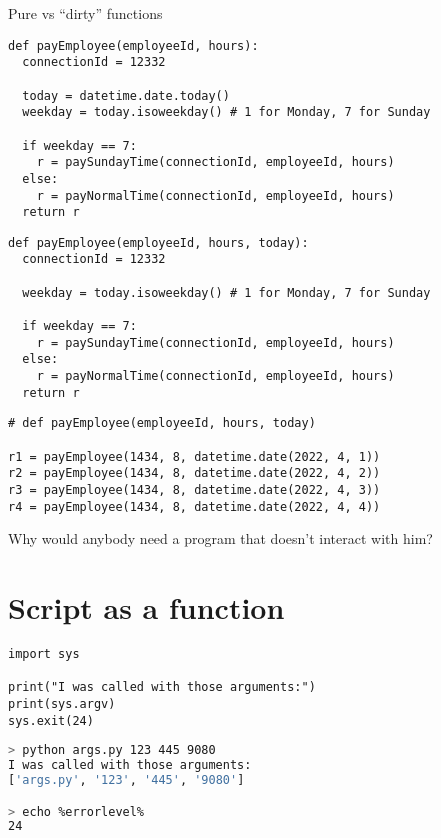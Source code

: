 \documentclass[aspectratio=169]{beamer}
\begin{document}
\begin{frame}
\centering
\Huge
Pure vs ``dirty'' functions
\end{frame}

\begin{frame}[fragile]
\begin{lstlisting}
def payEmployee(employeeId, hours):
  connectionId = 12332

  today = datetime.date.today()
  weekday = today.isoweekday() # 1 for Monday, 7 for Sunday

  if weekday == 7:
    r = paySundayTime(connectionId, employeeId, hours)
  else:
    r = payNormalTime(connectionId, employeeId, hours)
  return r
\end{lstlisting}
\end{frame}

\begin{frame}[fragile]
\begin{lstlisting}
def payEmployee(employeeId, hours, today):
  connectionId = 12332

  weekday = today.isoweekday() # 1 for Monday, 7 for Sunday

  if weekday == 7:
    r = paySundayTime(connectionId, employeeId, hours)
  else:
    r = payNormalTime(connectionId, employeeId, hours)
  return r
\end{lstlisting}
\end{frame}

\begin{frame}[fragile]
\begin{lstlisting}
# def payEmployee(employeeId, hours, today)

r1 = payEmployee(1434, 8, datetime.date(2022, 4, 1))
r2 = payEmployee(1434, 8, datetime.date(2022, 4, 2))
r3 = payEmployee(1434, 8, datetime.date(2022, 4, 3))
r4 = payEmployee(1434, 8, datetime.date(2022, 4, 4))
\end{lstlisting}
\end{frame}

\begin{frame}
Why would anybody need a program that doesn't interact with him?
\end{frame}

\section{Script as a function}

\begin{frame}[fragile]
\begin{lstlisting}
import sys

print("I was called with those arguments:")
print(sys.argv)
sys.exit(24)
\end{lstlisting}
\vspace{1.5cm}
\begin{lstlisting}[language=sh]
> python args.py 123 445 9080
I was called with those arguments:
['args.py', '123', '445', '9080']

> echo %errorlevel%
24
\end{lstlisting}
\end{frame}
\end{document}
